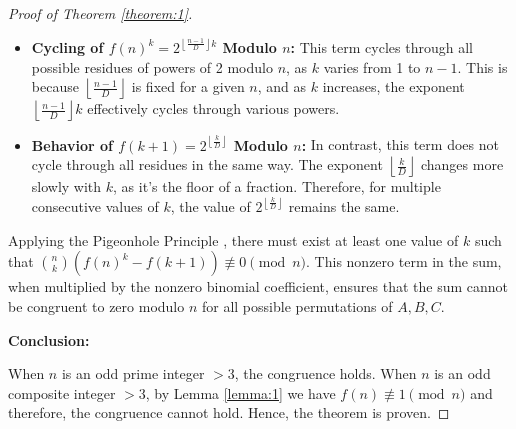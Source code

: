 \documentclass{article}
\theoremstyle{plain}
\theoremstyle{definition}
\begin{document}
\begin{proof}[Proof of Theorem \ref{theorem:1}]
\begin{itemize}
    \item \textbf{Cycling of \( f(n)^k = 2^{\left\lfloor \frac{n-1}{D} \right\rfloor k} \) Modulo \( n \):} This term cycles through all possible residues of powers of 2 modulo \( n \), as \( k \) varies from 1 to \( n-1 \). This is because \( \left\lfloor \frac{n-1}{D} \right\rfloor \) is fixed for a given \( n \), and as \( k \) increases, the exponent \( \left\lfloor \frac{n-1}{D} \right\rfloor k \) effectively cycles through various powers.
    \item \textbf{Behavior of \( f(k+1) = 2^{\left\lfloor \frac{k}{D} \right\rfloor} \) Modulo \( n \):} In contrast, this term does not cycle through all residues in the same way. The exponent \( \left\lfloor \frac{k}{D} \right\rfloor \) changes more slowly with \( k \), as it's the floor of a fraction. Therefore, for multiple consecutive values of \( k \), the value of \( 2^{\left\lfloor \frac{k}{D} \right\rfloor} \) remains the same.
\end{itemize}    

Applying the Pigeonhole Principle \cite{rosen2012}, there must exist at least one value of \( k \) such that \( \binom{n}{k} \left(f(n)^k - f(k+1)\right) \not\equiv 0 \pmod{n} \). This nonzero term in the sum, when multiplied by the nonzero binomial coefficient, ensures that the sum cannot be congruent to zero modulo \( n \) for all possible permutations of $A, B, C$.

\textbf{Conclusion:}

When $n$ is an odd prime integer $>3$, the congruence holds. When $n$ is an odd composite integer $>3$, by Lemma \ref{lemma:1} we have $f(n) \not\equiv 1 \pmod{n}$ and therefore, the congruence cannot hold. Hence, the theorem is proven.
\end{proof}
\end{document}
